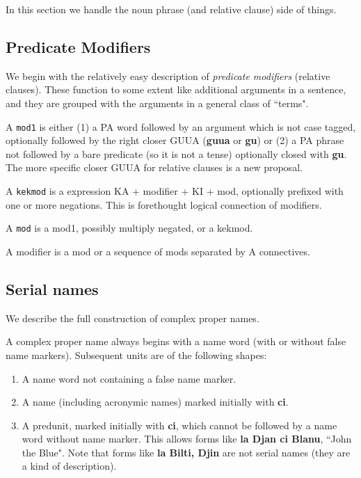 \documentclass[12pt]{book}
\begin{document}
{In this section we handle the noun phrase (and relative clause) side of things.

\subsection{Predicate Modifiers}

We begin with the relatively easy description of {\em predicate modifiers} (relative clauses).  These function to some extent like additional arguments
in a sentence, and they are grouped with the arguments in a general class of ``terms".

A {\tt mod1} is either (1) a PA word followed by an argument which is not case tagged, optionally followed by the right closer GUUA ({\bf guua} or {\bf gu})
or (2) a PA phrase not followed by a bare predicate (so it is not a tense) optionally closed with {\bf gu}.  The more specific closer GUUA for relative clauses
is a new proposal.

A {\tt kekmod} is a expression KA + modifier + KI + mod, optionally prefixed with one or more negations.  This is forethought logical connection of
modifiers.

A {\tt mod} is a mod1, possibly multiply negated, or a kekmod.

A modifier is a mod or a sequence of mods separated by A connectives.

\subsection{Serial names}

We describe the full construction of complex proper names.

A complex proper name always begins with a name word (with or without false name markers).  Subsequent units are of the following shapes:

\begin{enumerate}

\item A name word not containing a false name marker.

\item A name (including acronymic names) marked initially with {\bf ci}.

\item A predunit, marked initially with {\bf ci}, which cannot be followed by a name word without name marker.  This allows forms like {\bf la Djan ci Blanu}, ``John the Blue".  Note that forms
like {\bf la Bilti, Djin} are not serial names (they are a kind of description).



\end{enumerate}}
\end{document}
